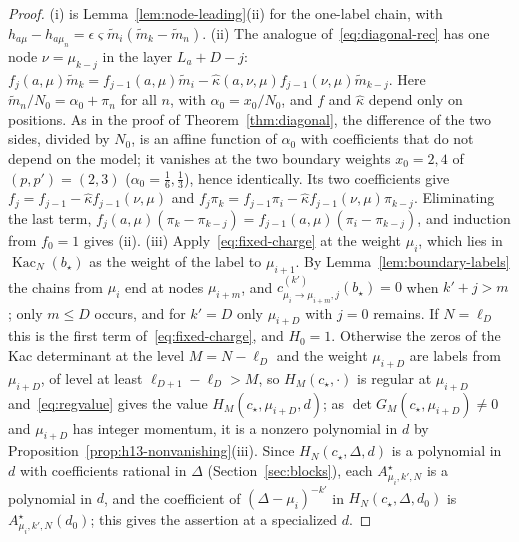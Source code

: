 \documentclass[twoside,10pt]{article}
\numberwithin{equation}{section}
\theoremstyle{slbody}
\theoremstyle{definition}
\theoremstyle{remark}
\begin{document}
\begin{proof}
(i) is Lemma~\ref{lem:node-leading}(ii) for the one-label chain, with
$h_{a\mu}-h_{a\mu_n}=\epsilon\varsigma\tilde m_i(\tilde m_k-\tilde m_n)$.  (ii) The analogue
of~\eqref{eq:diagonal-rec} has one node $\nu=\mu_{k-j}$ in the layer $L_a+D-j$:
$f_j(a,\mu)\tilde m_k=f_{j-1}(a,\mu)\tilde m_i-\hat\kappa(a,\nu,\mu)f_{j-1}(\nu,\mu)\tilde m_{k-j}$.
Here $\tilde m_n/N_0=\alpha_0+\pi_n$ for all $n$, with $\alpha_0=x_0/N_0$, and
$f$ and $\hat\kappa$ depend only on positions.  As in the proof of
Theorem~\ref{thm:diagonal}, the difference of the two sides, divided by $N_0$,
is an affine function of $\alpha_0$ with coefficients that do not depend on the
model; it vanishes at the two boundary weights $x_0=2,4$ of $(p,p')=(2,3)$
($\alpha_0=\frac16,\frac13$), hence identically.  Its two coefficients give
$f_j=f_{j-1}-\hat\kappa f_{j-1}(\nu,\mu)$ and
$f_j\pi_k=f_{j-1}\pi_i-\hat\kappa f_{j-1}(\nu,\mu)\pi_{k-j}$.  Eliminating the
last term, $f_j(a,\mu)(\pi_k-\pi_{k-j})=f_{j-1}(a,\mu)(\pi_i-\pi_{k-j})$, and
induction from $f_0=1$ gives (ii).  (iii) Apply~\eqref{eq:fixed-charge} at the
weight $\mu_i$, which lies in $\operatorname{Kac}_N(b_\star)$ as the weight of the
label to $\mu_{i+1}$.  By Lemma~\ref{lem:boundary-labels} the chains from
$\mu_i$ end at nodes $\mu_{i+m}$, and
$c^{(k')}_{\mu_i\to\mu_{i+m},j}(b_\star)=0$ when $k'+j>m$; only $m\leq D$ occurs,
and for $k'=D$ only $\mu_{i+D}$ with $j=0$ remains.  If $N=\ell_D$ this is the
first term of~\eqref{eq:fixed-charge}, and $H_0=1$.  Otherwise the zeros of the
Kac determinant at the level $M=N-\ell_D$ and the weight $\mu_{i+D}$ are labels
from $\mu_{i+D}$, of level at least $\ell_{D+1}-\ell_D>M$, so
$H_M(c_\star,\cdot)$ is regular at $\mu_{i+D}$ and~\eqref{eq:regvalue} gives the
value $H_M(c_\star,\mu_{i+D},d)$; as $\det G_M(c_\star,\mu_{i+D})\neq0$ and
$\mu_{i+D}$ has integer momentum, it is a nonzero polynomial in $d$ by
Proposition~\ref{prop:h13-nonvanishing}(iii).  Since $H_N(c_\star,\Delta,d)$ is a
polynomial in $d$ with coefficients rational in $\Delta$
(Section~\ref{sec:blocks}), each $A^\star_{\mu_i,k',N}$ is a polynomial in $d$, and
the coefficient of $(\Delta-\mu_i)^{-k'}$ in $H_N(c_\star,\Delta,d_0)$ is
$A^\star_{\mu_i,k',N}(d_0)$; this gives the assertion at a specialized $d$.
\end{proof}
\end{document}
